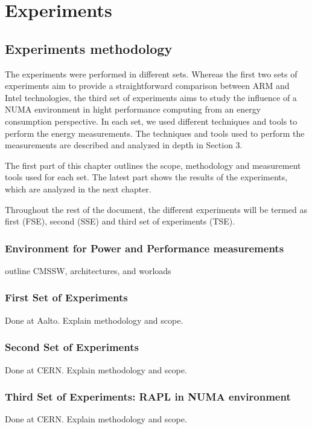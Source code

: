\chapter{Experiments}

\section{Experiments methodology}

The experiments were performed in different sets. 
Whereas the first two sets of experiments aim to provide a straightforward 
comparison between ARM and Intel technologies, the third set of experiments aims
to study the influence of a NUMA environment in hight performance computing from
an energy consumption perspective.
In each set, we used different
techniques and tools to perform the energy measurements. The techniques and tools
used to perform the measurements are described and analyzed in depth in 
Section 3.

The first part of this chapter outlines the scope, methodology and measurement
tools used for each set. The latest part shows the results of the 
experiments, which are analyzed in the next chapter.

Throughout the rest of the document, the different experiments will be termed as
first (FSE), second (SSE) and third set of experiments (TSE). 


\subsection{Environment for Power and Performance measurements}
outline CMSSW, architectures, and worloads   

\subsection{First Set of Experiments}
Done at Aalto. Explain methodology and scope.

\subsection{Second Set of Experiments}
Done at CERN. Explain methodology and scope.

\subsection{Third Set of Experiments: RAPL in NUMA environment}
Done at CERN. Explain methodology and scope.

